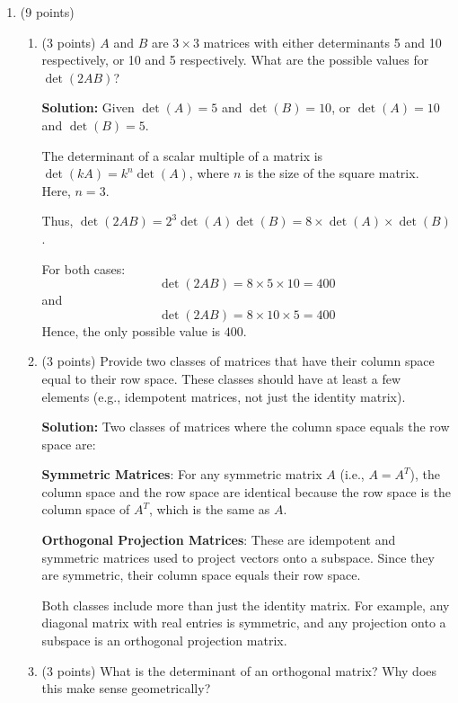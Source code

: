 \documentclass[12pt]{article}
\newcommand{\qspace}{\vspace{1em}} %
\newenvironment{solution}{\noindent\textbf{Solution:} }{\qspace}
\begin{document}
\begin{enumerate}
    \item (9 points)
    \begin{enumerate}
        \item (3 points) \( A \) and \( B \) are \( 3 \times 3 \) matrices with either determinants 5 and 10 respectively, or 10 and 5 respectively. What are the possible values for \( \det(2AB) \)?
    
        \begin{solution}
        Given \( \det(A) = 5 \) and \( \det(B) = 10 \), or \( \det(A) = 10 \) and \( \det(B) = 5 \).

        The determinant of a scalar multiple of a matrix is \( \det(kA) = k^n \det(A) \), where \( n \) is the size of the square matrix. Here, \( n = 3 \).

        Thus, \( \det(2AB) = 2^3 \det(A) \det(B) = 8 \times \det(A) \times \det(B) \).

        For both cases:
        \[
        \det(2AB) = 8 \times 5 \times 10 = 400
        \]
        and
        \[
        \det(2AB) = 8 \times 10 \times 5 = 400
        \]
        Hence, the only possible value is \( 400 \).
        \end{solution}
    
    \item (3 points) Provide two classes of matrices that have their column space equal to their row space. These classes should have at least a few elements (e.g., idempotent matrices, not just the identity matrix).
    
        \begin{solution}
        Two classes of matrices where the column space equals the row space are:

        \textbf{Symmetric Matrices}: For any symmetric matrix \( A \) (i.e., \( A = A^T \)), the column space and the row space are identical because the row space is the column space of \( A^T \), which is the same as \( A \).

        \textbf{Orthogonal Projection Matrices}: These are idempotent and symmetric matrices used to project vectors onto a subspace. Since they are symmetric, their column space equals their row space.

        Both classes include more than just the identity matrix. For example, any diagonal matrix with real entries is symmetric, and any projection onto a subspace is an orthogonal projection matrix.
        \end{solution}
    
    \item (3 points) What is the determinant of an orthogonal matrix? Why does this make sense geometrically?
    

\end{enumerate}
\end{enumerate}
\end{document}
